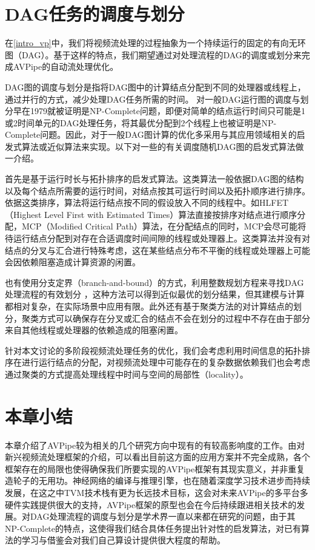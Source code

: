 \section{DAG任务的调度与划分}
在\ref{intro_vp}中，我们将视频流处理的过程抽象为一个持续运行的固定的有向无环图（DAG）。基于这样的特点，我们期望通过对处理流程的DAG的调度或划分来完成AVPipe的自动流处理优化。\par
DAG图的调度与划分是指将DAG图中的计算结点分配到不同的处理器或线程上，通过并行的方式，减少处理DAG任务所需的时间。
对一般DAG运行图的调度与划分早在1979就被证明是NP-Complete问题\cite{garey1979computers}，即便对简单的结点运行时间只可能是1或2时间单元的DAG处理任务，将其最优分配到2个线程上也被证明是NP-Complete问题。因此，对于一般DAG图计算的优化多采用与其应用领域相关的启发式算法或近似算法来实现\cite{kwok1999static}。以下对一些的有关调度随机DAG图的启发式算法做一介绍。\par
首先是基于运行时长与拓扑排序的启发式算法。这类算法一般依据DAG图的结构以及每个结点所需要的运行时间，对结点按其可运行时间以及拓扑顺序进行排序。依据这类排序，算法将运行结点按不同的假设放入不同的线程中。如HLFET（Highest Level First with Estimated Times）算法\cite{adam1974comparison}直接按排序对结点进行顺序分配，MCP（Modified Critical Path）算法\cite{wu1990hypertool}，在分配结点的同时，MCP会尽可能将待运行结点分配到对存在合适调度时间间隙的线程或处理器上。这类算法并没有对结点的分叉与汇合进行特殊考虑，这在某些结点分布不平衡的线程或处理器上可能会因依赖阻塞造成计算资源的闲置。\par
也有使用分支定界（branch-and-bound）的方式，利用整数规划方程来寻找DAG处理流程的有效划分 \cite{nossack2014branch}，这种方法可以得到近似最优的划分结果，但其建模与计算都相对复杂，在实际场景中应用有限。此外还有基于聚类方法的对计算结点的划分\cite{wong2003clustering}，聚类方式可以确保存在分叉或汇合的结点不会在划分的过程中不存在由于部分来自其他线程或处理器的依赖造成的阻塞闲置。\par
针对本文讨论的多阶段视频流处理任务的优化，我们会考虑利用时间信息的拓扑排序在进行运行结点的分配，对视频流处理中可能存在的复杂数据依赖我们也会考虑通过聚类的方式提高处理线程中时间与空间的局部性（locality）。\par

\section{本章小结}
本章介绍了AVPipe较为相关的几个研究方向中现有的有较高影响度的工作。由对新兴视频流处理框架的介绍，可以看出目前这方面的应用方案并不完全成熟，各个框架存在的局限也使得确保我们所要实现的AVPipe框架有其现实意义，并非重复造轮子的无用功。神经网络的编译与推理引擎，也在随着深度学习技术进步而持续发展，在这之中TVM技术栈有更为长远技术目标，这会对未来AVPipe的多平台多硬件实践提供很大的支持，AVPipe框架的原型也会在今后持续跟进相关技术的发展。对DAG处理流程的调度与划分是学术界一直以来都在研究的问题，由于其NP-Complete的特点，这使得我们结合具体任务提出针对性的启发算法，对已有算法的学习与借鉴会对我们自己算设计提供很大程度的帮助。